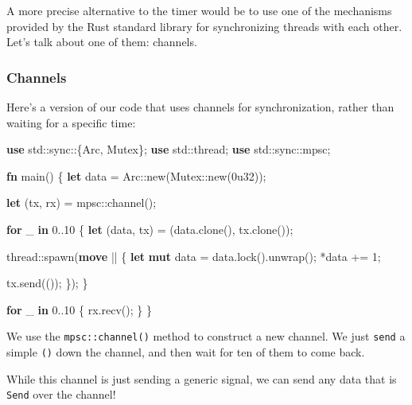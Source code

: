 \documentclass[a4paper,]{book}
\newenvironment{Shaded}{\begin{snugshade}}{\end{snugshade}}
\newcommand{\KeywordTok}[1]{\textcolor[rgb]{0.13,0.29,0.53}{\textbf{{#1}}}}
\newcommand{\DecValTok}[1]{\textcolor[rgb]{0.00,0.00,0.81}{{#1}}}
\newcommand{\NormalTok}[1]{{#1}}
\begin{document}
A more precise alternative to the timer would be to use one of the
mechanisms provided by the Rust standard library for synchronizing
threads with each other. Let's talk about one of them: channels.

\subsubsection{Channels}\label{channels}

Here's a version of our code that uses channels for synchronization,
rather than waiting for a specific time:

\begin{Shaded}
\begin{Highlighting}[]
\KeywordTok{use} \NormalTok{std::sync::\{Arc, Mutex\};}
\KeywordTok{use} \NormalTok{std::thread;}
\KeywordTok{use} \NormalTok{std::sync::mpsc;}

\KeywordTok{fn} \NormalTok{main() \{}
    \KeywordTok{let} \NormalTok{data = Arc::new(Mutex::new(}\DecValTok{0u32}\NormalTok{));}

    \KeywordTok{let} \NormalTok{(tx, rx) = mpsc::channel();}

    \KeywordTok{for} \NormalTok{_ }\KeywordTok{in} \DecValTok{0.}\NormalTok{.}\DecValTok{10} \NormalTok{\{}
        \KeywordTok{let} \NormalTok{(data, tx) = (data.clone(), tx.clone());}

        \NormalTok{thread::spawn(}\KeywordTok{move} \NormalTok{|| \{}
            \KeywordTok{let} \KeywordTok{mut} \NormalTok{data = data.lock().unwrap();}
            \NormalTok{*data += }\DecValTok{1}\NormalTok{;}

            \NormalTok{tx.send(());}
        \NormalTok{\});}
    \NormalTok{\}}

    \KeywordTok{for} \NormalTok{_ }\KeywordTok{in} \DecValTok{0.}\NormalTok{.}\DecValTok{10} \NormalTok{\{}
        \NormalTok{rx.recv();}
    \NormalTok{\}}
\NormalTok{\}}
\end{Highlighting}
\end{Shaded}

We use the \texttt{mpsc::channel()} method to construct a new channel.
We just \texttt{send} a simple \texttt{()} down the channel, and then
wait for ten of them to come back.

While this channel is just sending a generic signal, we can send any
data that is \texttt{Send} over the channel!
\end{document}
